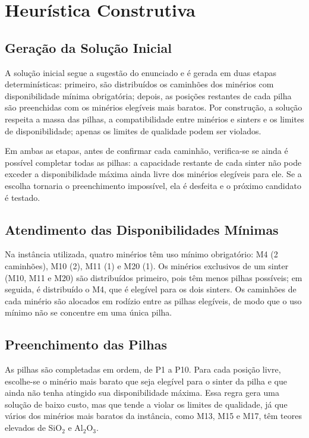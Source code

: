 \documentclass[conference]{IEEEtran}
\begin{document}
\section{Heurística Construtiva}\label{sec:construtiva}

\subsection{Geração da Solução Inicial}

A solução inicial segue a sugestão do enunciado e é gerada em duas etapas determinísticas: primeiro, são distribuídos os caminhões dos minérios com disponibilidade mínima obrigatória; depois, as posições restantes de cada pilha são preenchidas com os minérios elegíveis mais baratos. Por construção, a solução respeita a massa das pilhas, a compatibilidade entre minérios e sinters e os limites de disponibilidade; apenas os limites de qualidade podem ser violados.

Em ambas as etapas, antes de confirmar cada caminhão, verifica-se se ainda é possível completar todas as pilhas: a capacidade restante de cada sinter não pode exceder a disponibilidade máxima ainda livre dos minérios elegíveis para ele. Se a escolha tornaria o preenchimento impossível, ela é desfeita e o próximo candidato é testado.

\subsection{Atendimento das Disponibilidades Mínimas}

Na instância utilizada, quatro minérios têm uso mínimo obrigatório: M4 (2 caminhões), M10 (2), M11 (1) e M20 (1). Os minérios exclusivos de um sinter (M10, M11 e M20) são distribuídos primeiro, pois têm menos pilhas possíveis; em seguida, é distribuído o M4, que é elegível para os dois sinters. Os caminhões de cada minério são alocados em rodízio entre as pilhas elegíveis, de modo que o uso mínimo não se concentre em uma única pilha.

\subsection{Preenchimento das Pilhas}

As pilhas são completadas em ordem, de P1 a P10. Para cada posição livre, escolhe-se o minério mais barato que seja elegível para o sinter da pilha e que ainda não tenha atingido sua disponibilidade máxima. Essa regra gera uma solução de baixo custo, mas que tende a violar os limites de qualidade, já que vários dos minérios mais baratos da instância, como M13, M15 e M17, têm teores elevados de SiO$_2$ e Al$_2$O$_3$.
\end{document}
